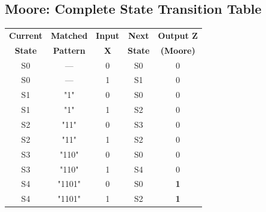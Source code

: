 \documentclass[12pt,a4paper]{article}
\begin{document}
\subsection{Moore: Complete State Transition Table}
\begin{center}
\begin{tabular}{|c|c|c|c|c|}
\hline
\textbf{Current} & \textbf{Matched} & \textbf{Input} & \textbf{Next} & \textbf{Output Z} \\
\textbf{State} & \textbf{Pattern} & \textbf{X} & \textbf{State} & \textbf{(Moore)} \\
\hline
S0 & --- & 0 & S0 & 0 \\
S0 & --- & 1 & S1 & 0 \\
\hline
S1 & "1" & 0 & S0 & 0 \\
S1 & "1" & 1 & S2 & 0 \\
\hline
S2 & "11" & 0 & S3 & 0 \\
S2 & "11" & 1 & S2 & 0 \\
\hline
S3 & "110" & 0 & S0 & 0 \\
S3 & "110" & 1 & S4 & 0 \\
\hline
S4 & "1101" & 0 & S0 & \textbf{1} \\
S4 & "1101" & 1 & S2 & \textbf{1} \\
\hline
\end{tabular}
\end{center}
\end{document}
